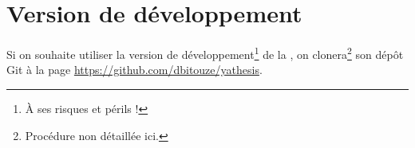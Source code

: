 \section{Version de développement}
\label{sec:vers-de-devel}

Si on souhaite utiliser la version de développement\footnote{À ses risques et
  périls !} de la \yatcl{}, on clonera\footnote{Procédure non détaillée ici.}
son dépôt Git à la page \url{https://github.com/dbitouze/yathesis}.


%
\iffalse
\fi
